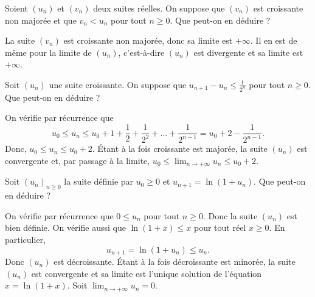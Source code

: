 \begin{question}
Soient $(u_n)$ et $(v_n)$ deux suites réelles. On suppose que $(v_n)$ est croissante non majorée et que $\displaystyle v_n < u_n$ pour tout $n\geq 0$. Que peut-on en déduire ?
\begin{answers}  
\end{answers}
\begin{explanations}
La suite $(v_n)$ est croissante non majorée, donc sa limite est $+\infty$. Il en est de même pour la limite de $(u_n)$, c'est-à-dire $(u_n)$ est divergente et sa limite est $+\infty$.
\end{explanations}
\end{question}


\begin{question}
Soit $(u_n)$ une suite croissante. On suppose que $\displaystyle u_{n+1}-u_n\leq \frac{1}{2^n}$ pour tout $n\geq 0$. Que peut-on en déduire ?
\begin{answers}  
\end{answers}
\begin{explanations}
On vérifie par récurrence que 
$$\displaystyle u_0\leq u_n\leq u_0+1+\frac{1}{2}+\frac{1}{2^2}+\dots +\frac{1}{2^{n-1}}=u_0+2-\frac{1}{2^{n-1}}.$$
Donc, $u_0\leq u_n\leq u_0+2$. Étant à la fois croissante est majorée, la suite $(u_n)$ est convergente et, par passage à la limite, $\displaystyle u_0\leq \lim _{n\to +\infty}u_n\leq u_0+2$.
\end{explanations}
\end{question}


\begin{question}
Soit $(u_n)_{n\geq 0}$ la suite définie par $u_0\geq 0$ et $\displaystyle u_{n+1}= \ln(1+u_n)$. Que peut-on en déduire ?
\begin{answers}  
\end{answers}
\begin{explanations}
On vérifie par récurrence que $\displaystyle 0\leq u_n$ pour tout $n\geq 0$. Donc la suite $(u_n)$ est bien définie. On vérifie aussi que $\ln (1+x)\leq x$ pour tout réel $x\geq 0$. En particulier, 
$$u_{n+1}=\ln (1+u_n)\leq u_n.$$
Donc $(u_n)$ est décroissante. Étant à la fois décroissante est minorée, la suite $(u_n)$ est convergente et sa limite est l'unique solution de l'équation $x=\ln (1+x)$. Soit $\displaystyle \lim _{n\to +\infty}u_n=0$.
\end{explanations}
\end{question}



